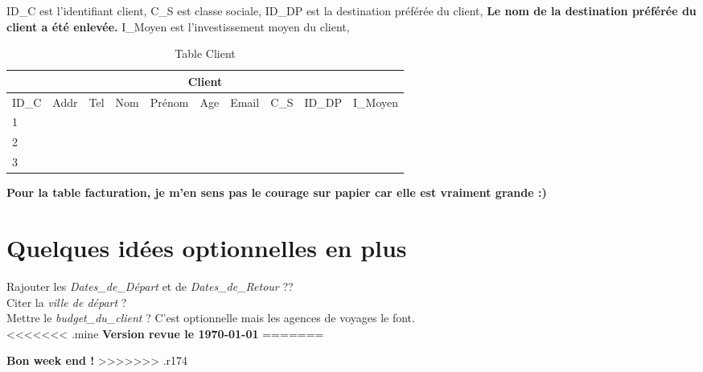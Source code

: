 \documentclass[10pt]{article}
\begin{document}

\begin{table}[h]
ID\_C est l'identifiant client,
C\_S est classe sociale,
ID\_DP est la destination préférée du client,
\textbf{Le nom de la destination préférée du client a été enlevée.}
I\_Moyen est l'investissement moyen du client,
\bigskip

\begin{tabular}{|l|c|c|c|c|c|c|c|c|c|}
\hline
\multicolumn{10}{|c|}{Client}\\
\hline
ID\_C& Addr& Tel & Nom & Prénom & Age & Email&C\_S & ID\_DP &I\_Moyen\\
\hline
1 & & &&  &  & &&&\\
\hline
2 & & &&  &  & &&&\\
\hline
3 & & &&  &  & &&&\\
\hline
\end{tabular}
\caption{Table Client}
\end{table}


\textbf{Pour la table facturation, je m'en sens pas le courage sur papier car elle est vraiment grande :) }

\section{Quelques idées optionnelles en plus}
Rajouter les \textit{Dates\_de\_Départ} et de \textit{Dates\_de\_Retour} ?? \\
Citer la \textit{ville de départ} ? \\
Mettre le \textit{budget\_du\_client} ? C'est optionnelle mais les agences de voyages le font. \\

<<<<<<< .mine
\textbf{Version revue le \today}
=======

\textbf{Bon week end !}
>>>>>>> .r174
\end{document}
